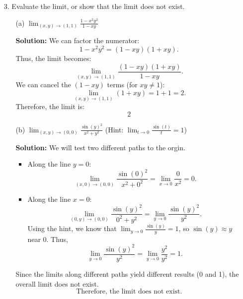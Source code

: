 \documentclass[reqno, 12pt]{amsart}
\begin{document}
\begin{itemize}
\begin{itemize}
    \end{itemize}

  \item[3.] Evaluate the limit, or show that the limit does not exist.

    \medskip
    \begin{itemize}
      \item[(a)] $\displaystyle\lim_{(x,y)\rightarrow(1,1)}\frac{1-x^2y^2}{1-xy}$
        \newline

        \begin{answerbox}
          \textbf{Solution:} We can factor the numerator:
          \[
            1 - x^2y^2 = (1 - xy)(1 + xy).
          \]
          Thus, the limit becomes:
          \[
            \lim_{(x,y) \to (1,1)} \frac{(1 - xy)(1 + xy)}{1 - xy}.
          \]
          We can cancel the $(1 - xy)$ terms (for $xy \neq 1$):
          \[
            \lim_{(x,y) \to (1,1)} (1 + xy) = 1 + 1 = 2.
          \]
          Therefore, the limit is:
          \[
            2
          \]
        \end{answerbox}
        \vspace{0.5 in}

      \item[(b)] $\displaystyle\lim_{(x,y)\rightarrow(0,0)}\frac{\sin(y)^2}{x^2+y^2}$ (Hint: $\displaystyle\lim_{t\rightarrow 0}\frac{\sin(t)}{t}=1$)
        \newline

        \begin{answerbox}
          \textbf{Solution:} We will test two different paths to the orgin.
          \begin{itemize}
            \item Along the line $y = 0$:
              \[
                \lim_{(x,0) \to (0,0)} \frac{\sin(0)^2}{x^2 + 0^2} = \lim_{x \to 0} \frac{0}{x^2} = 0.
              \]
            \item Along the line $x=0$:
              \[
                \lim_{(0,y) \to (0,0)} \frac{\sin(y)^2}{0^2 + y^2} = \lim_{y \to 0} \frac{\sin(y)^2}{y^2}.
              \]
              Using the hint, we know that $\lim_{y \to 0} \frac{\sin(y)}{y} = 1$, so $\sin(y) \approx y$ near $0$. Thus,
              \[
                \lim_{y \to 0} \frac{\sin(y)^2}{y^2} = \lim_{y \to 0} \frac{y^2}{y^2} = 1.
              \]
          \end{itemize}
          Since the limits along different paths yield different results (0 and 1), the overall limit does not exist.
          \[
            \text{Therefore, the limit does not exist.}
          \]
        \end{answerbox}
        \vspace{0.5 in}


\end{itemize}
\end{itemize}
\end{document}

